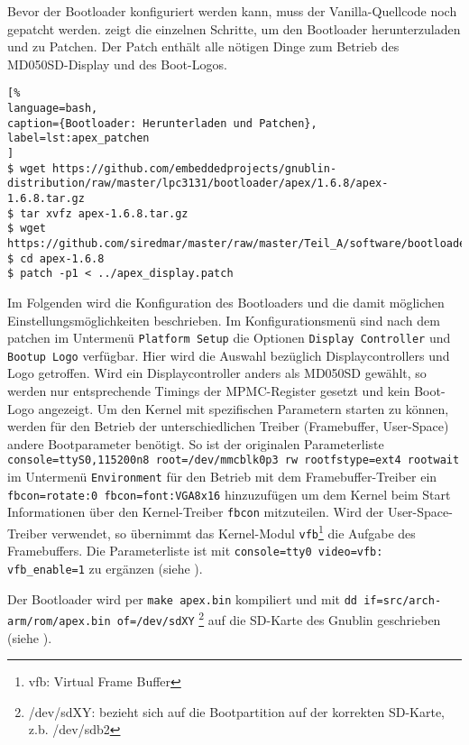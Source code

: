 Bevor der Bootloader konfiguriert werden kann, muss der Vanilla-Quellcode noch gepatcht werden.  zeigt die einzelnen Schritte, um den Bootloader herunterzuladen und zu Patchen. Der Patch enthält alle nötigen Dinge zum Betrieb des MD050SD-Display und des Boot-Logos.


\begin{lstlisting}[%
language=bash,
caption={Bootloader: Herunterladen und Patchen},
label=lst:apex_patchen
]
$ wget https://github.com/embeddedprojects/gnublin-distribution/raw/master/lpc3131/bootloader/apex/1.6.8/apex-1.6.8.tar.gz
$ tar xvfz apex-1.6.8.tar.gz
$ wget https://github.com/siredmar/master/raw/master/Teil_A/software/bootloader/apex_display.patch
$ cd apex-1.6.8
$ patch -p1 < ../apex_display.patch
\end{lstlisting}

Im Folgenden wird die Konfiguration des Bootloaders und die damit möglichen Einstellungsmöglichkeiten beschrieben. Im Konfigurationsmenü sind nach dem patchen im Untermenü \lstinline|Platform Setup| die Optionen \lstinline|Display Controller| und \lstinline|Bootup Logo| verfügbar. Hier wird die Auswahl bezüglich Displaycontrollers und Logo getroffen. Wird ein Displaycontroller anders als MD050SD gewählt, so werden nur entsprechende Timings der MPMC-Register gesetzt und kein Boot-Logo angezeigt. 
Um den Kernel mit spezifischen Parametern starten zu können, werden für den Betrieb der unterschiedlichen Treiber (Framebuffer, User-Space) andere Bootparameter benötigt. So ist der originalen Parameterliste 
\lstinline{console=ttyS0,115200n8 root=/dev/mmcblk0p3 rw rootfstype=ext4 rootwait} im Untermenü \lstinline|Environment| für den Betrieb mit dem Framebuffer-Treiber ein \lstinline|fbcon=rotate:0 fbcon=font:VGA8x16| hinzuzufügen um dem Kernel beim Start Informationen über den Kernel-Treiber \lstinline|fbcon| mitzuteilen. Wird der User-Space-Treiber verwendet, so übernimmt das Kernel-Modul \lstinline|vfb|\footnote{vfb: Virtual Frame Buffer} die Aufgabe des Framebuffers. Die Parameterliste ist mit \lstinline|console=tty0 video=vfb: vfb_enable=1| zu ergänzen (siehe \cite{LinuxKernelFBCON}).

Der Bootloader wird per \lstinline|make apex.bin| kompiliert und mit \lstinline|dd if=src/arch-arm/rom/apex.bin of=/dev/sdXY| \footnote{/dev/sdXY: bezieht sich auf die Bootpartition auf der korrekten SD-Karte, z.b. /dev/sdb2} auf die SD-Karte des Gnublin geschrieben (siehe \cite{GnublinWiki2013}).

